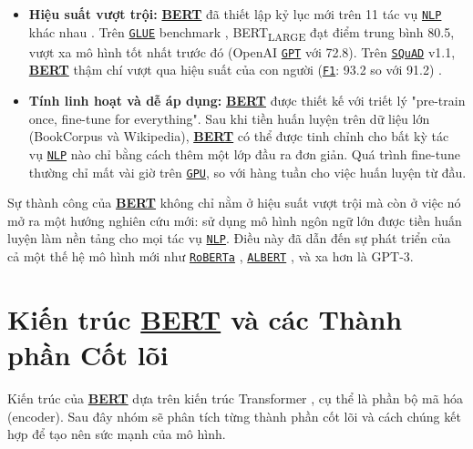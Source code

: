 \begin{itemize}
    \item \textbf{Hiệu suất vượt trội:} \hyperref[acro:bert]{\textbf{BERT}} đã thiết lập kỷ lục mới trên 11 tác vụ \hyperref[acro:nlp]{\texttt{NLP}} khác nhau \cite{devlin2018bert}.
    Trên \hyperref[acro:glue]{\texttt{GLUE}} benchmark \cite{wang2018glue}, BERT\textsubscript{LARGE} đạt điểm trung bình 80.5, vượt xa mô hình tốt nhất trước đó (OpenAI \hyperref[acro:gpt]{\texttt{GPT}} với 72.8).
    Trên \hyperref[acro:squad]{\texttt{SQuAD}} v1.1, \hyperref[acro:bert]{\textbf{BERT}} thậm chí vượt qua hiệu suất của con người (\hyperref[acro:f1]{\texttt{F1}}: 93.2 so với 91.2) \cite{devlin2018bert}.
    \item \textbf{Tính linh hoạt và dễ áp dụng:} \hyperref[acro:bert]{\textbf{BERT}} được thiết kế với triết lý "pre-train once, fine-tune for everything".
    Sau khi tiền huấn luyện trên dữ liệu lớn (BookCorpus và Wikipedia), \hyperref[acro:bert]{\textbf{BERT}} có thể được tinh chỉnh cho bất kỳ tác vụ \hyperref[acro:nlp]{\texttt{NLP}} nào chỉ bằng cách thêm một lớp đầu ra đơn giản.
    Quá trình fine-tune thường chỉ mất vài giờ trên \hyperref[acro:gpu]{\texttt{GPU}}, so với hàng tuần cho việc huấn luyện từ đầu.
\end{itemize}

Sự thành công của \hyperref[acro:bert]{\textbf{BERT}} không chỉ nằm ở hiệu suất vượt trội mà còn ở việc nó mở ra một hướng nghiên cứu mới: sử dụng mô hình ngôn ngữ lớn được tiền huấn luyện làm nền tảng cho mọi tác vụ \hyperref[acro:nlp]{\texttt{NLP}}.
Điều này đã dẫn đến sự phát triển của cả một thế hệ mô hình mới như \hyperref[acro:roberta]{\texttt{RoBERTa}} \cite{liu2019roberta}, \hyperref[acro:albert]{\texttt{ALBERT}} \cite{lan2019albert}, và xa hơn là GPT-3.
\section{Kiến trúc \hyperref[acro:bert]{\textbf{BERT}} và các Thành phần Cốt lõi}
\label{sec:kien_truc_bert}
Kiến trúc của \hyperref[acro:bert]{\textbf{BERT}} dựa trên kiến trúc Transformer \cite{vaswani2017attention}, cụ thể là phần bộ mã hóa (encoder).
Sau đây nhóm sẽ phân tích từng thành phần cốt lõi và cách chúng kết hợp để tạo nên sức mạnh của mô hình.
